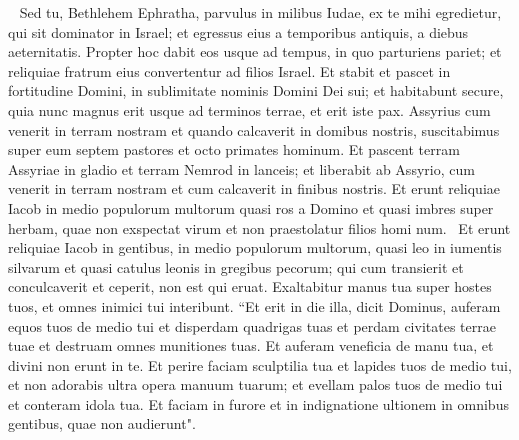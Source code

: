 \begin{biblechapter}   
\verse Sed tu, Bethlehem Ephratha, parvulus in milibus Iudae, ex te mihi egredietur, qui sit dominator in Israel; et egressus eius a temporibus antiquis, a diebus aeternitatis. 
\verse Propter hoc dabit eos usque ad tempus, in quo parturiens pariet; et reliquiae fratrum eius convertentur ad filios Israel. 
\verse Et stabit et pascet in fortitudine Domini, in sublimitate nominis Domini Dei sui; et habitabunt secure, quia nunc magnus erit usque ad terminos terrae, 
\verse et erit iste pax. Assyrius cum venerit in terram nostram et quando calcaverit in domibus nostris, suscitabimus super eum septem pastores et octo primates hominum. 
\verse Et pascent terram Assyriae in gladio et terram Nemrod in lanceis; et liberabit ab Assyrio, cum venerit in terram nostram et cum calcaverit in finibus nostris. 
\verse Et erunt reliquiae Iacob in medio populorum multorum quasi ros a Domino et quasi imbres super herbam, quae non exspectat virum et non praestolatur filios homi num.  
\verse Et erunt reliquiae Iacob in gentibus, in medio populorum multorum, quasi leo in iumentis silvarum et quasi catulus leonis in gregibus pecorum; qui cum transierit et conculcaverit et ceperit, non est qui eruat. 
\verse Exaltabitur manus tua super hostes tuos, et omnes inimici tui interibunt. 
\verse “Et erit in die illa, dicit Dominus, auferam equos tuos de medio tui et disperdam quadrigas tuas 
\verse et perdam civitates terrae tuae et destruam omnes munitiones tuas. 
\verse Et auferam veneficia de manu tua, et divini non erunt in te. 
\verse Et perire faciam sculptilia tua et lapides tuos de medio tui, et non adorabis ultra opera manuum tuarum; 
\verse et evellam palos tuos de medio tui et conteram idola tua. 
\verse Et faciam in furore et in indignatione ultionem in omnibus gentibus, quae non audierunt". 
\end{biblechapter}

